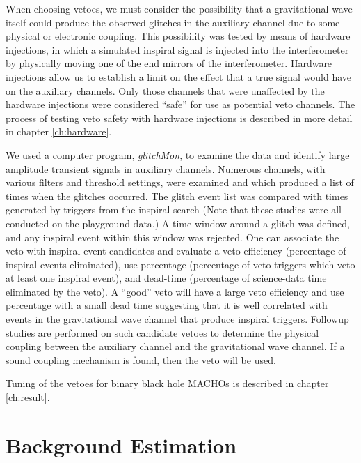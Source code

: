 When choosing vetoes, we must consider the possibility that a gravitational
wave itself could produce the observed glitches in the auxiliary channel due
to some physical or electronic coupling.  This possibility was tested by means
of hardware injections, in which a simulated inspiral signal is injected into
the interferometer by physically moving one of the end mirrors of the
interferometer. Hardware injections allow us to establish a limit on the
effect that a true signal would have on the auxiliary channels.  Only those
channels that were unaffected by the hardware injections were considered
``safe'' for use as potential veto channels. The process of testing veto
safety with hardware injections is described in more detail in chapter
\ref{ch:hardware}.

We used a computer program, {\it glitchMon}\cite{glitchMon}, to examine the
data and identify large amplitude transient signals in auxiliary channels.
Numerous channels, with various filters and threshold settings, were examined
and which produced a list of times when the glitches occurred. The glitch
event list was compared with times generated by triggers from the inspiral
search (Note that these studies were all conducted on the playground
data.)  A time window around a glitch was defined, and any inspiral event
within this window was rejected. One can associate the veto with inspiral
event candidates and evaluate a veto efficiency (percentage of inspiral events
eliminated), use percentage (percentage of veto triggers which veto at least
one inspiral event), and dead-time (percentage of science-data time eliminated
by the veto). A ``good'' veto will have a large veto efficiency and use
percentage with a small dead time suggesting that it is well correlated with
events in the gravitational wave channel that produce inspiral triggers.
Followup studies are performed on such candidate vetoes to determine the
physical coupling between the auxiliary channel and the gravitational wave
channel. If a sound coupling mechanism is found, then the veto will be used.

Tuning of the vetoes for binary black hole MACHOs is described
in chapter \ref{ch:result}.

\section{Background Estimation}
\label{s:background}

